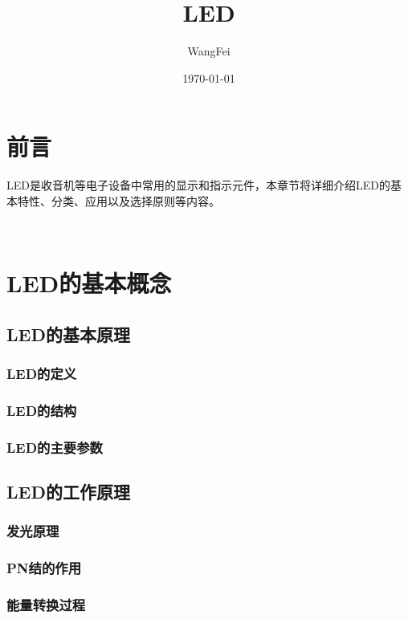 \documentclass[12pt,UTF8]{ctexbook}
\title{\heiti\zihao{0} LED}
\author{WangFei}
\date{\today}
\begin{document}
\maketitle
\tableofcontents

\frontmatter
\chapter{前言}

LED是收音机等电子设备中常用的显示和指示元件，本章节将详细介绍LED的基本特性、分类、应用以及选择原则等内容。

\mainmatter

~\\

\chapter{LED的基本概念}

\section{LED的基本原理}

\subsection{LED的定义}

\subsection{LED的结构}

\subsection{LED的主要参数}

\section{LED的工作原理}

\subsection{发光原理}

\subsection{PN结的作用}

\subsection{能量转换过程}
\end{document}
